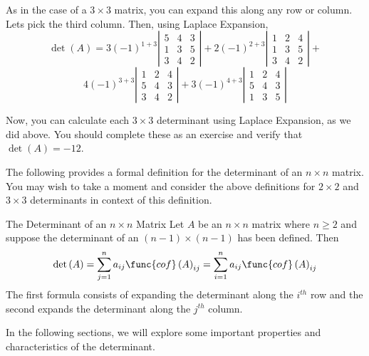 \begin{solution} As in the case of a $3\times 3$ matrix, you can expand this along any row or
column. Lets pick the third column. Then, using Laplace Expansion, 
\begin{equation*}
\det \left( A\right) 
=
3\left( -1\right) ^{1+3}\left\vert
\begin{array}{rrr}
5 & 4 & 3 \\
1 & 3 & 5 \\
3 & 4 & 2
\end{array}
\right\vert +2\left( -1\right) ^{2+3}\left\vert
\begin{array}{rrr}
1 & 2 & 4 \\
1 & 3 & 5 \\
3 & 4 & 2
\end{array}
\right\vert +
\end{equation*}
\begin{equation*}
4\left( -1\right) ^{3+3}\left\vert
\begin{array}{rrr}
1 & 2 & 4 \\
5 & 4 & 3 \\
3 & 4 & 2
\end{array}
\right\vert +3\left( -1\right) ^{4+3}\left\vert
\begin{array}{rrr}
1 & 2 & 4 \\
5 & 4 & 3 \\
1 & 3 & 5
\end{array}
\right\vert 
\end{equation*}

Now, you can calculate each $3 \times 3$ determinant using Laplace Expansion, as we did above. 
You should complete these as an exercise and verify that $\det \left( A \right)= -12$. 
\end{solution}

The following provides a formal definition for the determinant of an $n \times n$ matrix. You may
wish to take a moment and consider the above definitions for $2 \times 2$ and $3 \times 3$ determinants 
in context of this definition.

\begin{definition}{The Determinant of an $n\times n$ Matrix}\label{def:nbyndeterminant}
Let $A$ be an $n\times n$ matrix where $n\geq 2$ and suppose the
determinant of an $\left( n-1\right) \times \left( n-1\right) $ has been
defined. Then
\begin{equation*}
\det \left( A\right) =\sum_{j=1}^{n}a_{ij}\func{cof}\left( A\right)
_{ij}=\sum_{i=1}^{n}a_{ij}\func{cof}\left( A\right) _{ij}
\end{equation*}
The first formula consists of expanding the determinant along the $i^{th}$
row and the second expands the determinant along the $j^{th}$ column.
\end{definition}

In the following sections, we will explore some important properties and characteristics of the determinant.